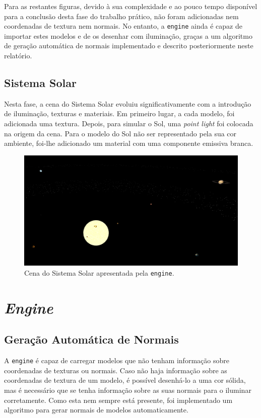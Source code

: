 \documentclass[12pt, a4paper]{article}
\begin{document}
Para as restantes figuras, devido à sua complexidade e ao pouco tempo disponível para a conclusão
desta fase do trabalho prático, não foram adicionadas nem coordenadas de textura nem normais. No
entanto, a \texttt{engine} ainda é capaz de importar estes modelos e de os desenhar com iluminação,
graças a um algoritmo de geração automática de normais implementado e descrito posteriormente neste
relatório.

\subsection{Sistema Solar}

Nesta fase, a cena do Sistema Solar evoluiu significativamente com a introdução de iluminação,
texturas e materiais. Em primeiro lugar, a cada modelo, foi adicionada uma textura. Depois, para
simular o Sol, uma \emph{point light} foi colocada na origem da cena. Para o modelo do Sol não ser
representado pela sua cor ambiente, foi-lhe adicionado um material com uma componente emissiva
branca.

\begin{figure}[H]
    \centering
    \includegraphics[width=\textwidth]{res/phase4/SolarSystem.png}
    \caption{Cena do Sistema Solar apresentada pela \texttt{engine}.}
\end{figure}

\section{\emph{Engine}}

\subsection{Geração Automática de Normais}

A \texttt{engine} é capaz de carregar modelos que não tenham informação sobre coordenadas de
texturas ou normais. Caso não haja informação sobre as coordenadas de textura de um modelo, é
possível desenhá-lo a uma cor sólida, mas é necessário que se tenha informação sobre as suas normais
para o iluminar corretamente. Como esta nem sempre está presente, foi implementado um algoritmo para
gerar normais de modelos automaticamente.
\end{document}
